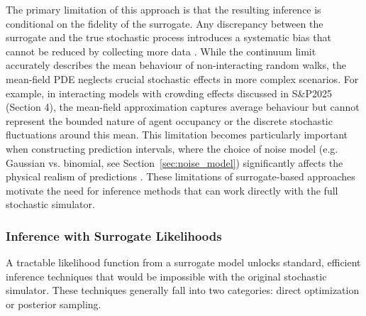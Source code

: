 \documentclass{article}
\newcommand{\SP}{S\&P2025}
\begin{document}
The primary limitation of this approach is that the resulting inference is conditional on the fidelity of the surrogate. Any discrepancy between the surrogate and the true stochastic process introduces a systematic bias that cannot be reduced by collecting more data \citep{KennedyOHagan2001,BrynjarsdottirOHagan2014}. While the continuum limit accurately describes the mean behaviour of non-interacting random walks, the mean-field PDE neglects crucial stochastic effects in more complex scenarios. For example, in interacting models with crowding effects discussed in \SP{} (Section 4), the mean-field approximation captures average behaviour but cannot represent the bounded nature of agent occupancy or the discrete stochastic fluctuations \citep{BrunaChapman2012,Baker2010} around this mean. This limitation becomes particularly important when constructing prediction intervals, where the choice of noise model (e.g. Gaussian vs. binomial, see Section~\ref{sec:noise_model}) significantly affects the physical realism of predictions \citep{McCullaghNelder1989,Gelman1995}. These limitations of surrogate-based approaches motivate the need for inference methods that can work directly with the full stochastic simulator.



\subsubsection{Inference with Surrogate Likelihoods}
A tractable likelihood function from a surrogate model unlocks standard, efficient inference techniques that would be impossible with the original stochastic simulator. These techniques generally fall into two categories: direct optimization or posterior sampling.
\end{document}
